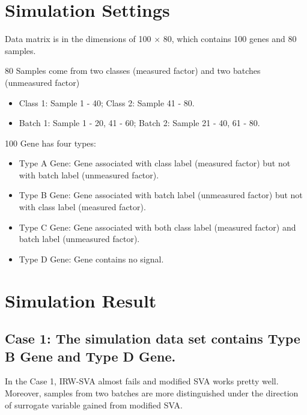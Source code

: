 \documentclass[11pt]{article}
\begin{document}
\section{Simulation Settings} 

Data matrix is in the dimensions of 100 $\times$ 80, which contains 100 genes and 80 samples.

80 Samples come from two classes (measured factor) and two batches (unmeasured factor)
\begin{itemize} 
\item Class 1: Sample 1 - 40; Class 2: Sample 41 - 80.
\item Batch 1: Sample 1 - 20, 41 - 60; Batch 2: Sample 21 - 40, 61 - 80.
\end{itemize}

100 Gene has four types:
\begin{itemize}
\item Type A Gene: Gene associated with class label (measured factor) but not with batch label (unmeasured factor).
\item Type B Gene: Gene associated with batch label (unmeasured factor) but not with class label (measured factor).
\item Type C Gene: Gene associated with both class label (measured factor) and batch label (unmeasured factor).
\item Type D Gene: Gene contains no signal.
\end{itemize}

\section{Simulation Result}

\subsection{Case 1: The simulation data set contains Type B Gene and Type D Gene.}

In the Case 1, IRW-SVA almost fails and modified SVA works pretty well. Moreover, samples from two batches are more distinguished under the direction of surrogate variable gained from modified SVA.
\end{document}
